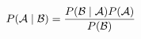 \begin{equation}
    P( \mathcal{A} \mid \mathcal{B} ) = \frac{P( \mathcal{B} \mid \mathcal{A} ) P( \mathcal{A} )}{P( \mathcal{B} )}
\label{eq:bayes_basic}
\end{equation}


